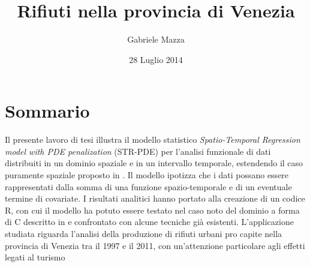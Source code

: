 \documentclass[a4paper,11pt,twoside,openright]{book}							%
\date{28 Luglio 2014}
\author{Gabriele Mazza}
\title{Rifiuti nella provincia di Venezia}
\begin{document}





\chapter*{Sommario}
\label{Cap:sommario}
\thispagestyle{empty}
Il presente lavoro di tesi illustra il modello statistico \textit{Spatio-Temporal Regression model with PDE penalization} (STR-PDE) per l'analisi funzionale di dati distribuiti in un dominio spaziale e in un intervallo temporale, estendendo il caso puramente spaziale proposto in \cite{art:sangalli}. Il modello ipotizza che i dati possano essere rappresentati dalla somma di una funzione spazio-temporale e di un eventuale termine di covariate. I risultati analitici hanno portato alla creazione di un codice R, con cui il modello ha potuto essere testato nel caso noto del dominio a forma di C descritto in \cite{art:ramsay} e confrontato con alcune tecniche già esistenti. L'applicazione studiata riguarda l'analisi della produzione di rifiuti urbani pro capite nella provincia di Venezia tra il 1997 e il 2011, con un'attenzione particolare agli effetti legati al turismo
\newpage
\thispagestyle{empty}
\end{document}
